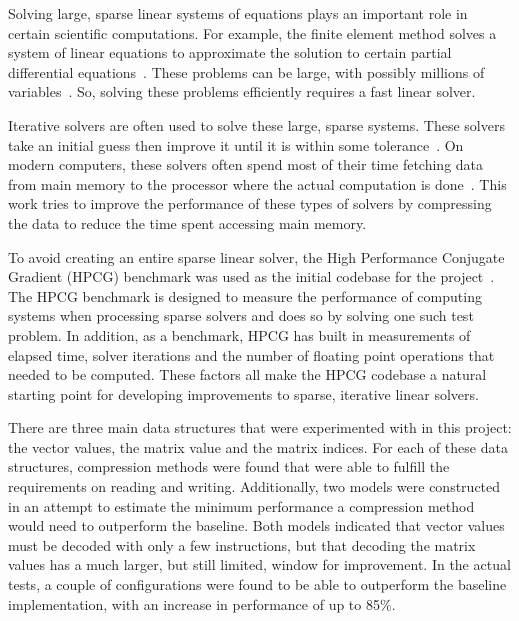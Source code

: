Solving large, sparse linear systems of equations plays an important role in certain scientific computations.
For example, the finite element method solves a system of linear equations to approximate the solution to certain partial differential equations~\cite{Saad:2003:IterativeMethods}.
These problems can be large, with possibly millions of variables~\cite{Davis:2011:FloridaMatrixCollection}.
So, solving these problems efficiently requires a fast linear solver.

Iterative solvers are often used to solve these large, sparse systems.
These solvers take an initial guess then improve it until it is within some tolerance~\cite{Saad:2003:IterativeMethods}.
On modern computers, these solvers often spend most of their time fetching data from main memory to the processor where the actual computation is done~\cite{Lawlor:2013:compression}.
This work tries to improve the performance of these types of solvers by compressing the data to reduce the time spent accessing main memory.

To avoid creating an entire sparse linear solver, the High Performance Conjugate Gradient (HPCG) benchmark was used as the initial codebase for the project~\cite{Dongarra:2015:HPCG}.
The HPCG benchmark is designed to measure the performance of computing systems when processing sparse solvers and does so by solving one such test problem.
In addition, as a benchmark, HPCG has built in measurements of elapsed time, solver iterations and the number of floating point operations that needed to be computed.
These factors all make the HPCG codebase a natural starting point for developing improvements to sparse, iterative linear solvers.

There are three main data structures that were experimented with in this project: the vector values, the matrix value and the matrix indices.
For each of these data structures, compression methods were found that were able to fulfill the requirements on reading and writing.
Additionally, two models were constructed in an attempt to estimate the minimum performance a compression method would need to outperform the baseline.
Both models indicated that vector values must be decoded with only a few instructions, but that decoding the matrix values has a much larger, but still limited, window for improvement.
In the actual tests, a couple of configurations were found to be able to outperform the baseline implementation, with an increase in performance of up to 85\%.

